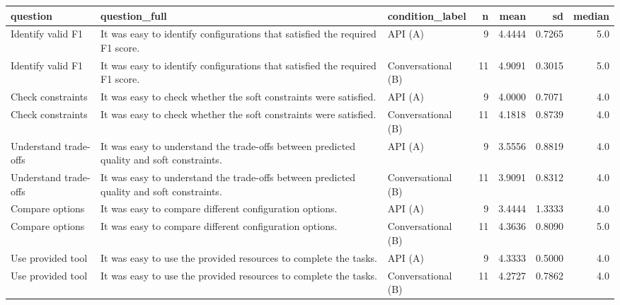 \begin{tabular}{lllrrrr}
\toprule
             question &                                                                            question_full &    condition_label &  n &   mean &     sd &  median \\
\midrule
    Identify valid F1 &             It was easy to identify configurations that satisfied the required F1 score. &            API (A) &  9 & 4.4444 & 0.7265 &     5.0 \\
    Identify valid F1 &             It was easy to identify configurations that satisfied the required F1 score. & Conversational (B) & 11 & 4.9091 & 0.3015 &     5.0 \\
    Check constraints &                        It was easy to check whether the soft constraints were satisfied. &            API (A) &  9 & 4.0000 & 0.7071 &     4.0 \\
    Check constraints &                        It was easy to check whether the soft constraints were satisfied. & Conversational (B) & 11 & 4.1818 & 0.8739 &     4.0 \\
Understand trade-offs & It was easy to understand the trade-offs between predicted quality and soft constraints. &            API (A) &  9 & 3.5556 & 0.8819 &     4.0 \\
Understand trade-offs & It was easy to understand the trade-offs between predicted quality and soft constraints. & Conversational (B) & 11 & 3.9091 & 0.8312 &     4.0 \\
      Compare options &                                  It was easy to compare different configuration options. &            API (A) &  9 & 3.4444 & 1.3333 &     4.0 \\
      Compare options &                                  It was easy to compare different configuration options. & Conversational (B) & 11 & 4.3636 & 0.8090 &     5.0 \\
    Use provided tool &                         It was easy to use the provided resources to complete the tasks. &            API (A) &  9 & 4.3333 & 0.5000 &     4.0 \\
    Use provided tool &                         It was easy to use the provided resources to complete the tasks. & Conversational (B) & 11 & 4.2727 & 0.7862 &     4.0 \\
\bottomrule
\end{tabular}
